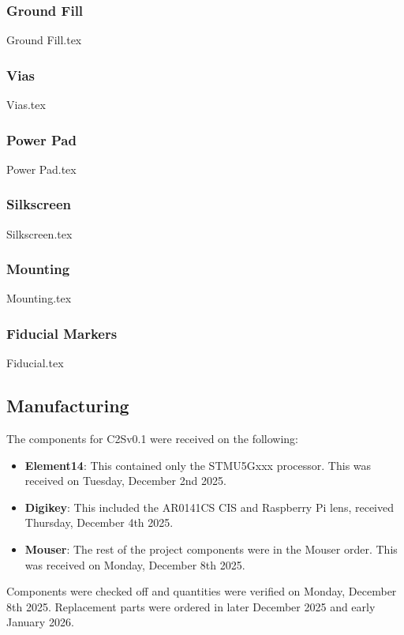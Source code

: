     \subsubsection{Ground Fill}
        {Ground Fill.tex}

    \subsubsection{Vias}
        {Vias.tex}

    \subsubsection{Power Pad}\label{sec:v0.1-powerpad}
        {Power Pad.tex}

    \subsubsection{Silkscreen}\label{sec:v0.1-silkscreen-pcb}
        {Silkscreen.tex}

    \subsubsection{Mounting}
        {Mounting.tex}

    \subsubsection{Fiducial Markers}
        {Fiducial.tex}

\subsection{Manufacturing}\label{sec:manufacturing-v0.1}

    The components for C2Sv0.1 were received on the following:
    \begin{itemize}
        \item \textbf{Element14}: This contained only the STMU5Gxxx processor. This was received on Tuesday, December 2nd 2025.
        \item \textbf{Digikey}: This included the AR0141CS CIS and Raspberry Pi lens, received Thursday, December 4th 2025.
        \item \textbf{Mouser}: The rest of the project components were in the Mouser order. This was received on Monday, December 8th 2025.
    \end{itemize}
    Components were checked off and quantities were verified on Monday, December 8th 2025. Replacement parts were ordered in later December 2025 and early January 2026.

